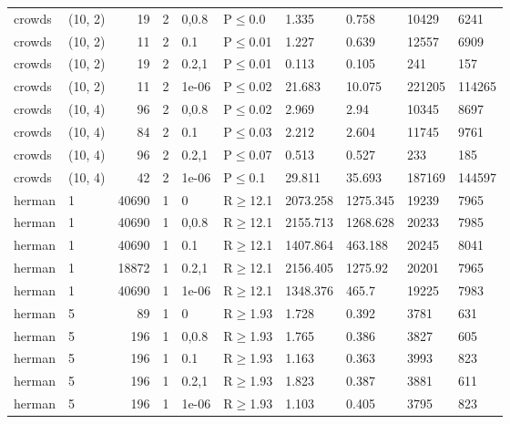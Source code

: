 \begin{longtable}{llrrllllll}
 crowds        & (10, 2)  &     	19 &   2 & 0,0.8 & P$\leq$0.0   & 1.335    & 0.758    & 10429   & 6241   \\
 crowds        & (10, 2)  &     	11 &   2 & 0.1   & P$\leq$0.01  & 1.227    & 0.639    & 12557   & 6909   \\
 crowds        & (10, 2)  &     	19 &   2 & 0.2,1 & P$\leq$0.01  & 0.113    & 0.105    & 241     & 157    \\
 crowds        & (10, 2)  &     	11 &   2 & 1e-06 & P$\leq$0.02  & 21.683   & 10.075   & 221205  & 114265 \\
 crowds        & (10, 4)  &     	96 &   2 & 0,0.8 & P$\leq$0.02  & 2.969    & 2.94     & 10345   & 8697   \\
 crowds        & (10, 4)  &     	84 &   2 & 0.1   & P$\leq$0.03  & 2.212    & 2.604    & 11745   & 9761   \\
 crowds        & (10, 4)  &     	96 &   2 & 0.2,1 & P$\leq$0.07  & 0.513    & 0.527    & 233     & 185    \\
 crowds        & (10, 4)  &     	42 &   2 & 1e-06 & P$\leq$0.1   & 29.811   & 35.693   & 187169  & 144597 \\
 herman        & 1        &  	40690 &   1 & 0     & R$\geq$12.1  & 2073.258 & 1275.345 & 19239   & 7965   \\
 herman        & 1        &  	40690 &   1 & 0,0.8 & R$\geq$12.1  & 2155.713 & 1268.628 & 20233   & 7985   \\
 herman        & 1        &  	40690 &   1 & 0.1   & R$\geq$12.1  & 1407.864 & 463.188  & 20245   & 8041   \\
 herman        & 1        &  	18872 &   1 & 0.2,1 & R$\geq$12.1  & 2156.405 & 1275.92  & 20201   & 7965   \\
 herman        & 1        &  	40690 &   1 & 1e-06 & R$\geq$12.1  & 1348.376 & 465.7    & 19225   & 7983   \\
 herman        & 5        &     	89 &   1 & 0     & R$\geq$1.93  & 1.728    & 0.392    & 3781    & 631    \\
 herman        & 5        &    	196 &   1 & 0,0.8 & R$\geq$1.93  & 1.765    & 0.386    & 3827    & 605    \\
 herman        & 5        &    	196 &   1 & 0.1   & R$\geq$1.93  & 1.163    & 0.363    & 3993    & 823    \\
 herman        & 5        &    	196 &   1 & 0.2,1 & R$\geq$1.93  & 1.823    & 0.387    & 3881    & 611    \\
 herman        & 5        &    	196 &   1 & 1e-06 & R$\geq$1.93  & 1.103    & 0.405    & 3795    & 823    \\

\end{longtable}
